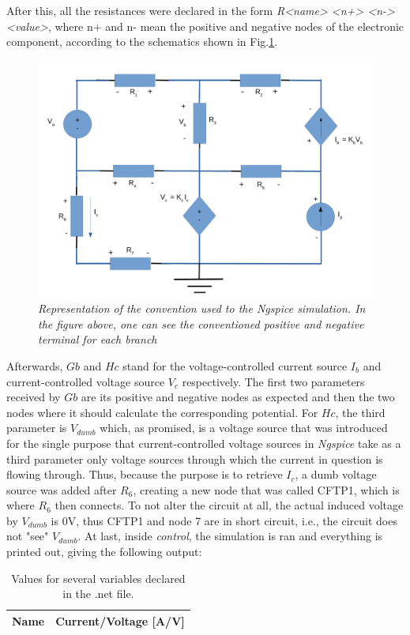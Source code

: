 After this, all the resistances were declared in the form \textit{R<name> <n+> <n-> <value>}, where n+ and n- mean the positive and negative nodes of the electronic component, according to the schematics shown in Fig.\ref{fig:polos}. \\

\begin{figure}[h]
    \centering
    \includegraphics[width = 0.7\linewidth]{esquemacpolos.pdf}
        \caption{\textit{Representation of the convention used to the Ngspice simulation. In the figure above, one can see the conventioned positive and negative terminal for each branch}}
    \label{fig:polos}
\end{figure}

Afterwards, $Gb$ and $Hc$ stand for the voltage-controlled current source $I_b$ and current-controlled voltage source $V_c$ respectively. The first two parameters received by $Gb$ are its positive and negative nodes as expected and then the two nodes where it should calculate the corresponding potential. For $Hc$, the third parameter is $V_{dumb}$ which, as promised, is a voltage source that was introduced for the single purpose that current-controlled voltage sources in \textit{Ngspice} take as a third parameter only voltage sources through which the current in question is flowing through. Thus, because the purpose is to retrieve $I_c$, a dumb voltage source was added after $R_6$, creating a new node that was called CFTP1, which is where $R_6$ then connects. To not alter the circuit at all, the actual induced voltage by $V_{dumb}$ is 0V, thus CFTP1 and node 7 are in short circuit, i.e., the circuit does not "see" $V_{dumb}$. At last, inside \textit{control}, the simulation is ran and everything is printed out, giving the following output:\\\par


\begin{table}[H]
\setlength{\tabcolsep}{10pt}
\renewcommand{\arraystretch}{1.1}
\centering
    \begin{tabular}{||c|c||}
    \hline
    Name & Current/Voltage [A/V]\\
    \hline
    
    \end{tabular}
\vspace{0.2 cm}
\caption{Values for several variables declared in the .net file.}
\label{max}
\end{table}


